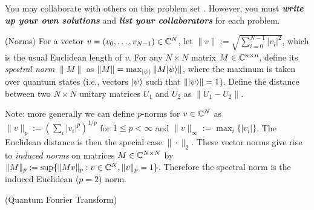 \medskip
\noindent You may collaborate with others on this problem set%
.  However, you must \textbf{\emph{write up your own solutions}} and
\textbf{\emph{list your collaborators}} for each problem.

\begin{questions}
  \question (Norms) For a vector
  $v = (v_0, \ldots, v_{N-1})\in \mathbb{C}^N$, let
  $\|v\|:=\sqrt{\sum_{i=0}^{N-1} |v_i|^2}$, which is the usual
  Euclidean length of $v$. For any $N \times N$ matrix
  $M\in \mathbb{C}^{n\times n}$, define its \emph{spectral norm}
  $\|M \|$ as $\|M\| = \max_{\lvert \psi \rangle} \| M \lvert \psi \rangle\|$, where the
  maximum is taken over quantum states (i.e., vectors $\lvert \psi \rangle$
  such that $\| \lvert \psi \rangle\| = 1$).  Define the distance between two
  $N \times N$ unitary matrices $U_1$ and $U_2$ as $\|U_1 - U_2\|$.

  Note: more generally we can define $p$-norms for $v\in \mathbb{C}^N$
  as $\|v\|_p:= \left(\sum_i |v_i|^p\right)^{1/p}$ for
  $1\leq p < \infty$ and $\|v\|_\infty:= \max_i \{|v_i|\}$. The
  Euclidean distance is then the special case $\|\cdot\|_2$. These
  vector norms give rise to \emph{induced norms} on matrices
  $M \in \mathbb{C}^{N\times N}$ by
  $\|M\|_{p}:=\sup\{\|Mv\|_{p}: v\in \mathbb{C}^N,
  \|v\|_p=1\}$. Therefore the spectral norm is the induced Euclidean
  ($p=2$) norm.
  
  \question (Quantum Fourier Transform)
  \begin{parts}
    


\end{parts}
\end{questions}

